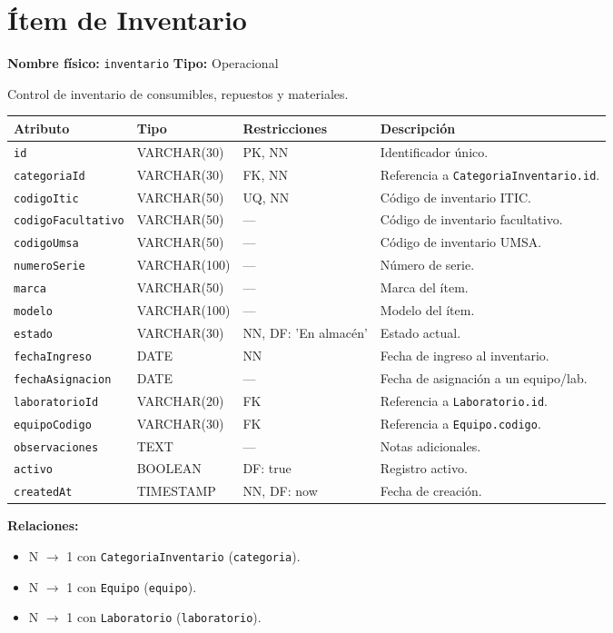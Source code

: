 \documentclass[12pt,a4paper]{article}
\newenvironment{tabladesc}[3]{%
  \section{#1}
  \textbf{Nombre físico:} \texttt{#2} \hfill \textbf{Tipo:} #3\par
  \medskip
}{%
  \bigskip
}
\begin{document}
\begin{tabladesc}{Ítem de Inventario}{inventario}{Operacional}

Control de inventario de consumibles, repuestos y materiales.

\bigskip
\begin{longtable}{L{3.5cm} L{2.5cm} L{2cm} L{7.5cm}}
\toprule
\textbf{Atributo} & \textbf{Tipo} & \textbf{Restricciones} & \textbf{Descripción} \\
\midrule
\endhead
\bottomrule
\endfoot
\texttt{id}              & VARCHAR(30)  & PK, NN & Identificador único. \\
\texttt{categoriaId}     & VARCHAR(30)  & FK, NN & Referencia a \texttt{CategoriaInventario.id}. \\
\texttt{codigoItic}      & VARCHAR(50)  & UQ, NN & Código de inventario ITIC. \\
\texttt{codigoFacultativo}& VARCHAR(50) & ---    & Código de inventario facultativo. \\
\texttt{codigoUmsa}      & VARCHAR(50)  & ---    & Código de inventario UMSA. \\
\texttt{numeroSerie}     & VARCHAR(100) & ---    & Número de serie. \\
\texttt{marca}           & VARCHAR(50)  & ---    & Marca del ítem. \\
\texttt{modelo}          & VARCHAR(100) & ---    & Modelo del ítem. \\
\texttt{estado}          & VARCHAR(30)  & NN, DF: 'En almacén' & Estado actual. \\
\texttt{fechaIngreso}    & DATE         & NN     & Fecha de ingreso al inventario. \\
\texttt{fechaAsignacion} & DATE         & ---    & Fecha de asignación a un equipo/lab. \\
\texttt{laboratorioId}   & VARCHAR(20)  & FK     & Referencia a \texttt{Laboratorio.id}. \\
\texttt{equipoCodigo}    & VARCHAR(30)  & FK     & Referencia a \texttt{Equipo.codigo}. \\
\texttt{observaciones}   & TEXT         & ---    & Notas adicionales. \\
\texttt{activo}          & BOOLEAN      & DF: true & Registro activo. \\
\texttt{createdAt}       & TIMESTAMP    & NN, DF: now & Fecha de creación. \\
\bottomrule
\end{longtable}

\textbf{Relaciones:}
\begin{itemize}[nosep]
  \item N $\rightarrow$ 1 con \texttt{CategoriaInventario} (\texttt{categoria}).
  \item N $\rightarrow$ 1 con \texttt{Equipo} (\texttt{equipo}).
  \item N $\rightarrow$ 1 con \texttt{Laboratorio} (\texttt{laboratorio}).
\end{itemize}
\end{tabladesc}
\end{document}
